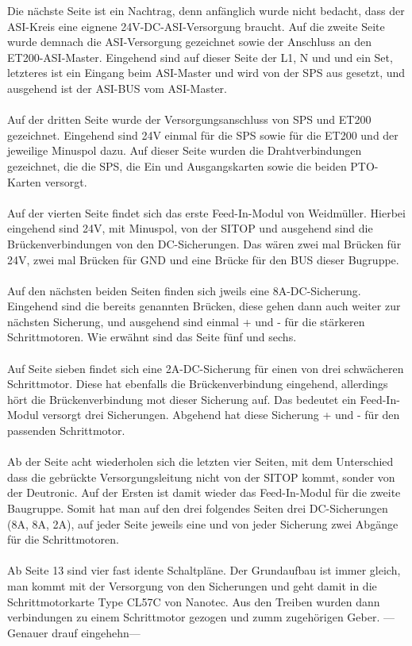     Die nächste Seite ist ein Nachtrag, denn anfänglich wurde nicht bedacht, dass der ASI-Kreis eine eignene 24V-DC-ASI-Versorgung braucht. Auf die zweite Seite wurde demnach die ASI-Versorgung gezeichnet sowie der Anschluss an den ET200-ASI-Master. Eingehend sind auf dieser Seite der L1, N und und ein Set, letzteres ist ein Eingang beim ASI-Master und wird von der SPS aus gesetzt, und ausgehend ist der ASI-BUS vom ASI-Master.\\\\
    Auf der dritten Seite wurde der Versorgungsanschluss von SPS und ET200 gezeichnet. Eingehend sind 24V einmal für die SPS sowie für die ET200 und der jeweilige Minuspol dazu. Auf dieser Seite wurden die Drahtverbindungen gezeichnet, die die SPS, die Ein und Ausgangskarten sowie die beiden PTO-Karten versorgt.\\\\
    Auf der vierten Seite findet sich das erste Feed-In-Modul von Weidmüller. Hierbei eingehend sind 24V, mit Minuspol, von der SITOP und ausgehend sind die Brückenverbindungen von den DC-Sicherungen. Das wären zwei mal Brücken für 24V, zwei mal Brücken für GND und eine Brücke für den BUS dieser Bugruppe.\\\\
    Auf den nächsten beiden Seiten finden sich jweils eine 8A-DC-Sicherung. Eingehend sind die bereits genannten Brücken, diese gehen dann auch weiter zur nächsten Sicherung, und ausgehend sind einmal + und - für die stärkeren Schrittmotoren. Wie erwähnt sind das Seite fünf und sechs.\\\\
    Auf Seite sieben findet sich eine 2A-DC-Sicherung für einen von drei schwächeren Schrittmotor. Diese hat ebenfalls die Brückenverbindung eingehend, allerdings hört die Brückenverbindung mot dieser Sicherung auf. Das bedeutet ein Feed-In-Modul versorgt drei Sicherungen. Abgehend hat diese Sicherung + und - für den passenden Schrittmotor.\\\\
    Ab der Seite acht wiederholen sich die letzten vier Seiten, mit dem Unterschied dass die gebrückte Versorgungsleitung nicht von der SITOP kommt, sonder von der Deutronic. Auf der Ersten ist damit wieder das Feed-In-Modul für die zweite Baugruppe. Somit hat man auf den drei folgendes Seiten drei DC-Sicherungen (8A, 8A, 2A), auf jeder Seite jeweils eine und von jeder Sicherung zwei Abgänge für die Schrittmotoren.\\\\
    Ab Seite 13 sind vier fast idente Schaltpläne. Der Grundaufbau ist immer gleich, man kommt mit der Versorgung von den Sicherungen und geht damit in die Schrittmotorkarte Type CL57C von Nanotec. Aus den Treiben wurden dann verbindungen zu einem Schrittmotor gezogen und zumm zugehörigen Geber. ---Genauer drauf eingehehn---
    
